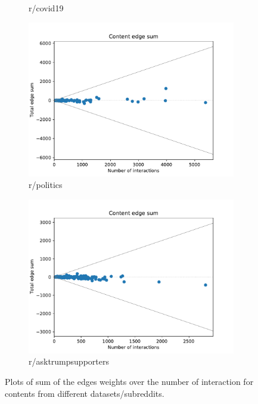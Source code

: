 \begin{figure}
\begin{center}
\begin{subfigure}[b]{0.4\textwidth}
			\caption{r/covid19}
			\label{fig:tex/out/covid19200/edge-sum-n-interactions.pdf}
		\end{subfigure}
		\begin{subfigure}[b]{0.4\textwidth}
			\centering
			\includegraphics[width=\textwidth]{tex/out/politics200/edge-sum-n-interactions.pdf}
			\caption{r/politics}
			\label{fig:tex/out/politics200/edge-sum-n-interactions.pdf}
		\end{subfigure}
		\begin{subfigure}[b]{0.4\textwidth}
			\centering
			\includegraphics[width=\textwidth]{tex/out/asktrumpsupporters200/edge-sum-n-interactions.pdf}
			\caption{r/asktrumpsupporters}
			\label{fig:tex/out/covid19200/edge-sum-n-interactions.pdf}
		\end{subfigure}
	\end{center}
	\caption[Sum edges over number of interactions for many datasets]{Plots of
		sum of the edges weights over the number of interaction for contents
		from different datasets/subreddits.}
	\label{fig:edge-sum-n-interactions}
\end{figure}

